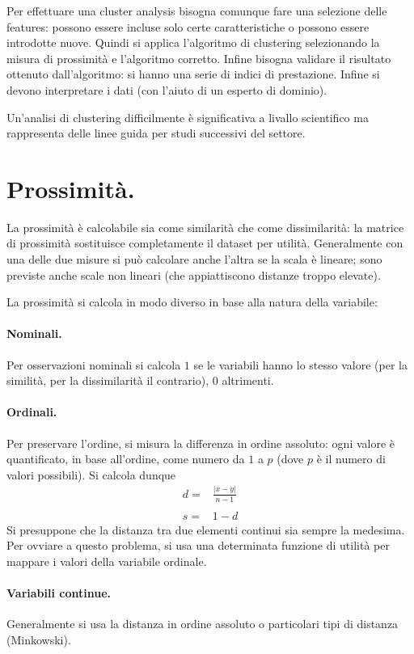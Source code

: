 \documentclass[11pt, a4page, twocolumn]{article}
\begin{document}
Per effettuare una cluster analysis bisogna comunque fare una selezione delle features: possono essere incluse solo certe caratteristiche o possono essere introdotte nuove.
Quindi si applica l'algoritmo di clustering selezionando la misura di prossimità e l'algoritmo corretto.
Infine bisogna validare il risultato ottenuto dall'algoritmo: si hanno una serie di indici di prestazione.
Infine si devono interpretare i dati (con l'aiuto di un esperto di dominio).

Un'analisi di clustering difficilmente è significativa a livallo scientifico ma rappresenta delle linee guida per studi successivi del settore.

\section{Prossimità.}
La prossimità è calcolabile sia come similarità che come dissimilarità: la matrice di prossimità sostituisce completamente il dataset per utilità.
Generalmente con una delle due misure si può calcolare anche l'altra se la scala è lineare; sono previste anche scale non lineari (che appiattiscono distanze troppo elevate).

La prossimità si calcola in modo diverso in base alla natura della variabile:

\paragraph{Nominali.}
Per osservazioni nominali si calcola $1$ se le variabili hanno lo stesso valore (per la similità, per la dissimilarità il contrario), $0$ altrimenti.

\paragraph{Ordinali.}
Per preservare l'ordine, si misura la differenza in ordine assoluto: ogni valore è quantificato, in base all'ordine, come numero da $1$ a $p$ (dove $p$ è il numero di valori possibili).
Si calcola dunque
\begin{align*}
d =& \frac{{|x - y|}}{n - 1} \\ \\
s =& 1 - d
\end{align*}
Si presuppone che la distanza tra due elementi continui sia sempre la medesima.
Per ovviare a questo problema, si usa una determinata funzione di utilità per mappare i valori della variabile ordinale.

\paragraph{Variabili continue.}
Generalmente si usa la distanza in ordine assoluto o particolari tipi di distanza (Minkowski).
\end{document}
